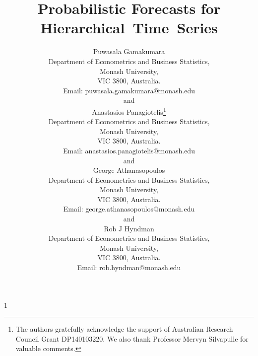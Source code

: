 \documentclass[12pt]{article}
\newcommand{\blind}{1}
\theoremstyle{definition}
\begin{document}
	
	\def\spacingset#1{\renewcommand{\baselinestretch}%
		{#1}\small\normalsize} \spacingset{1}
	
	
	
	\blind
	{
		\title{\bf Probabilistic Forecasts for Hierarchical~Time~Series}
		        \author{Puwasala Gamakumara\\
			    Department of Econometrics and Business Statistics,\\
			    Monash University,\\ VIC 3800, Australia.\\
			    Email: puwasala.gamakumara@monash.edu \\
			    and \\
			    Anastasios Panagiotelis\thanks{
			    	The authors gratefully acknowledge the support of Australian Research Council Grant DP140103220.  We also thank Professor Mervyn Silvapulle for valuable comments.}\hspace{.2cm}\\
			    Department of Econometrics and Business Statistics,\\
		    	Monash University,\\ VIC 3800, Australia.\\
			    Email: anastasios.panagiotelis@monash.edu \\
			    and \\
		        George Athanasopoulos\\
		        Department of Econometrics and Business Statistics,\\
		        Monash University,\\ VIC 3800, Australia.\\
		        Email: george.athanasopoulos@monash.edu \\
		        and \\
	            Rob J Hyndman\\
	            Department of Econometrics and Business Statistics,\\
	            Monash University,\\ VIC 3800, Australia.\\
	            Email: rob.hyndman@monash.edu \\}
		\maketitle
	} \fi
	
\end{document}
